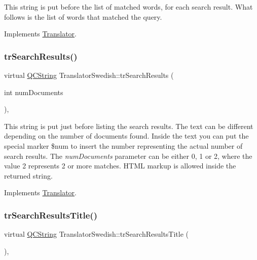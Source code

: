 This string is put before the list of matched words, for each search result. What follows is the list of words that matched the query. 

Implements \mbox{\hyperlink{class_translator}{Translator}}.

\mbox{\label{class_translator_swedish_a0eb9463cc95f05798c0fff9c2b9b4d1b}} 
\subsubsection{\texorpdfstring{trSearchResults()}{trSearchResults()}}
{\footnotesize\ttfamily virtual \mbox{\hyperlink{class_q_c_string}{Q\+C\+String}} Translator\+Swedish\+::tr\+Search\+Results (\begin{DoxyParamCaption}\item[{int}]{num\+Documents }\end{DoxyParamCaption})\hspace{0.3cm}{\ttfamily [inline]}, {\ttfamily [virtual]}}

This string is put just before listing the search results. The text can be different depending on the number of documents found. Inside the text you can put the special marker \$num to insert the number representing the actual number of search results. The {\itshape num\+Documents} parameter can be either 0, 1 or 2, where the value 2 represents 2 or more matches. H\+T\+ML markup is allowed inside the returned string. 

Implements \mbox{\hyperlink{class_translator}{Translator}}.

\mbox{\label{class_translator_swedish_a199352e92b97e941b63eee8b75bb267f}} 
\subsubsection{\texorpdfstring{trSearchResultsTitle()}{trSearchResultsTitle()}}
{\footnotesize\ttfamily virtual \mbox{\hyperlink{class_q_c_string}{Q\+C\+String}} Translator\+Swedish\+::tr\+Search\+Results\+Title (\begin{DoxyParamCaption}{ }\end{DoxyParamCaption})\hspace{0.3cm}{\ttfamily [inline]}, {\ttfamily [virtual]}}

